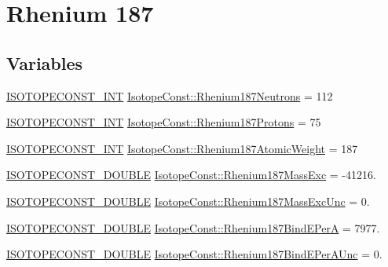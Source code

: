 \hypertarget{group___isotope_const-_rhenium-_re187}{}\section{Rhenium 187}
\label{group___isotope_const-_rhenium-_re187}
\subsection*{Variables}
\begin{DoxyCompactItemize}
\item 
\mbox{\hyperlink{group___isotope_const-_macros_ga5f18360b3e99483a35c32d789e62621c}{I\+S\+O\+T\+O\+P\+E\+C\+O\+N\+S\+T\+\_\+\+I\+NT}} \mbox{\hyperlink{group___isotope_const-_rhenium-_re187_gaefe39668b7b29cd929ebf2ede3fe37e4}{Isotope\+Const\+::\+Rhenium187\+Neutrons}} = 112
\item 
\mbox{\hyperlink{group___isotope_const-_macros_ga5f18360b3e99483a35c32d789e62621c}{I\+S\+O\+T\+O\+P\+E\+C\+O\+N\+S\+T\+\_\+\+I\+NT}} \mbox{\hyperlink{group___isotope_const-_rhenium-_re187_gaab7d21d04afeedcd61701ce53f0f5e7a}{Isotope\+Const\+::\+Rhenium187\+Protons}} = 75
\item 
\mbox{\hyperlink{group___isotope_const-_macros_ga5f18360b3e99483a35c32d789e62621c}{I\+S\+O\+T\+O\+P\+E\+C\+O\+N\+S\+T\+\_\+\+I\+NT}} \mbox{\hyperlink{group___isotope_const-_rhenium-_re187_ga3faa645d7d88c65f69d6405135453fa4}{Isotope\+Const\+::\+Rhenium187\+Atomic\+Weight}} = 187
\item 
\mbox{\hyperlink{group___isotope_const-_macros_ga8f45a7272ce02c0b4c65c44636ed719a}{I\+S\+O\+T\+O\+P\+E\+C\+O\+N\+S\+T\+\_\+\+D\+O\+U\+B\+LE}} \mbox{\hyperlink{group___isotope_const-_rhenium-_re187_ga0a7bd0c09697a38c1a86a8f900cbb7fc}{Isotope\+Const\+::\+Rhenium187\+Mass\+Exc}} = -\/41216.
\item 
\mbox{\hyperlink{group___isotope_const-_macros_ga8f45a7272ce02c0b4c65c44636ed719a}{I\+S\+O\+T\+O\+P\+E\+C\+O\+N\+S\+T\+\_\+\+D\+O\+U\+B\+LE}} \mbox{\hyperlink{group___isotope_const-_rhenium-_re187_gaf3d7bf3bd148f79b190bd8b75c37f741}{Isotope\+Const\+::\+Rhenium187\+Mass\+Exc\+Unc}} = 0.
\item 
\mbox{\hyperlink{group___isotope_const-_macros_ga8f45a7272ce02c0b4c65c44636ed719a}{I\+S\+O\+T\+O\+P\+E\+C\+O\+N\+S\+T\+\_\+\+D\+O\+U\+B\+LE}} \mbox{\hyperlink{group___isotope_const-_rhenium-_re187_ga0a1171fcc9505093451a90addd2d4915}{Isotope\+Const\+::\+Rhenium187\+Bind\+E\+PerA}} = 7977.
\item 
\mbox{\hyperlink{group___isotope_const-_macros_ga8f45a7272ce02c0b4c65c44636ed719a}{I\+S\+O\+T\+O\+P\+E\+C\+O\+N\+S\+T\+\_\+\+D\+O\+U\+B\+LE}} \mbox{\hyperlink{group___isotope_const-_rhenium-_re187_ga8d40081a5bfd2b651b5b480c4474c0ae}{Isotope\+Const\+::\+Rhenium187\+Bind\+E\+Per\+A\+Unc}} = 0.

\end{DoxyCompactItemize}
